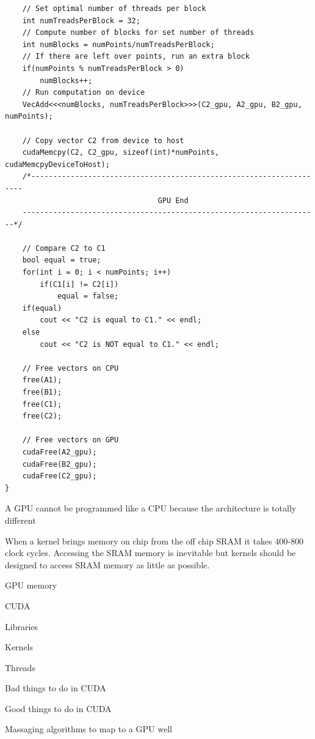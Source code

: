 \begin{lstlisting}
	// Set optimal number of threads per block
	int numTreadsPerBlock = 32;
	// Compute number of blocks for set number of threads
	int numBlocks = numPoints/numTreadsPerBlock;
	// If there are left over points, run an extra block
	if(numPoints % numTreadsPerBlock > 0)
		numBlocks++;
	// Run computation on device
	VecAdd<<<numBlocks, numTreadsPerBlock>>>(C2_gpu, A2_gpu, B2_gpu, numPoints);

	// Copy vector C2 from device to host
	cudaMemcpy(C2, C2_gpu, sizeof(int)*numPoints, cudaMemcpyDeviceToHost);
	/*--------------------------------------------------------------------
                               	   GPU End
	--------------------------------------------------------------------*/

	// Compare C2 to C1
	bool equal = true;
	for(int i = 0; i < numPoints; i++)
		if(C1[i] != C2[i])
			equal = false;
	if(equal)
		cout << "C2 is equal to C1." << endl;
	else
		cout << "C2 is NOT equal to C1." << endl;

	// Free vectors on CPU
	free(A1);
	free(B1);
	free(C1);
	free(C2);

	// Free vectors on GPU
	cudaFree(A2_gpu);
	cudaFree(B2_gpu);
	cudaFree(C2_gpu);
}
\end{lstlisting}

A GPU cannot be programmed like a CPU because the architecture is totally different

When a kernel brings memory on chip from the off chip SRAM it takes 400-800 clock cycles.
Accessing the SRAM memory is inevitable but kernels should be designed to access SRAM memory as little as possible.

GPU memory

CUDA

Libraries

Kernels

Threads

Bad things to do in CUDA

Good things to do in CUDA

Massaging algorithms to map to a GPU well


